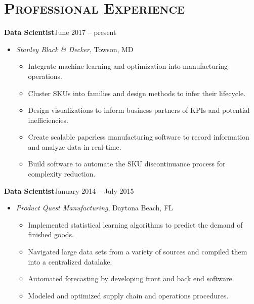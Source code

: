 \documentclass[10pt]{article}
\begin{document}
\section*{\textsc{Professional Experience}}
\textbf{Data Scientist}\hfill June 2017 -- present
\begin{itemize}[noitemsep]
    \item[] \textit{Stanley Black \& Decker}, Towson, MD
    \begin{itemize}[noitemsep]
        \item Integrate machine learning and optimization into manufacturing operations.
        \item Cluster SKUs into families and design methods to infer their lifecycle.
        \item Design visualizations to inform business partners of KPIs and potential inefficiencies.
        \item Create scalable paperless manufacturing software to record information and analyze data in real-time.
        \item Build software to automate the SKU discontinuance process for complexity reduction.
    \end{itemize}
\end{itemize}
\textbf{Data Scientist}\hfill January 2014 -- July 2015
\begin{itemize}[noitemsep]
    \item[] \textit{Product Quest Manufacturing}, Daytona Beach, FL
    \begin{itemize}[noitemsep]
        \item Implemented statistical learning algorithms to predict the demand of finished goods.
        \item Navigated large data sets from a variety of sources and compiled them into a centralized datalake.
        \item Automated forecasting by developing front and back end software.
        \item Modeled and optimized supply chain and operations procedures.
    \end{itemize}
\end{itemize}
\end{document}
